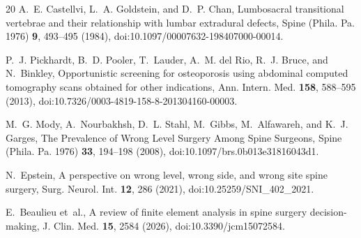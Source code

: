 \documentclass[aapm,mph,amsmath,amssymb,reprint]{revtex4-2}
\newif\ifcaptionlist \captionlistfalse
\begin{document}
\begin{thebibliography}{20}
A.~E. Castellvi, L.~A. Goldstein, and D.~P. Chan,
\newblock Lumbosacral transitional vertebrae and their relationship with lumbar extradural defects,
\newblock Spine (Phila. Pa. 1976) {\bf 9}, 493--495 (1984),
\newblock doi:10.1097/00007632-198407000-00014.

P.~J. Pickhardt, B.~D. Pooler, T.~Lauder, A.~M. del Rio, R.~J. Bruce, and N.~Binkley,
\newblock Opportunistic screening for osteoporosis using abdominal computed tomography scans obtained for other indications,
\newblock Ann. Intern. Med. {\bf 158}, 588--595 (2013),
\newblock doi:10.7326/0003-4819-158-8-201304160-00003.

M.~G. Mody, A.~Nourbakhsh, D.~L. Stahl, M.~Gibbs, M.~Alfawareh, and K.~J. Garges,
\newblock The Prevalence of Wrong Level Surgery Among Spine Surgeons,
\newblock Spine (Phila. Pa. 1976) {\bf 33}, 194--198 (2008),
\newblock doi:10.1097/brs.0b013e31816043d1.

N.~Epstein,
\newblock A perspective on wrong level, wrong side, and wrong site spine surgery,
\newblock Surg. Neurol. Int. {\bf 12}, 286 (2021),
\newblock doi:10.25259/SNI\_402\_2021.

E.~Beaulieu et~al.,
\newblock A review of finite element analysis in spine surgery decision-making,
\newblock J. Clin. Med. {\bf 15}, 2584 (2026),
\newblock doi:10.3390/jcm15072584.

\end{thebibliography}

\ifcaptionlist\fi
\end{document}

